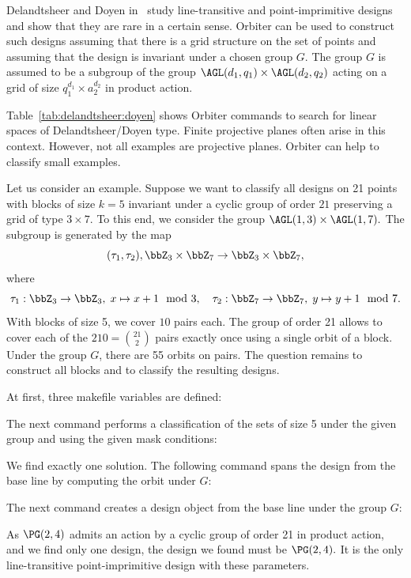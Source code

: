 

Delandtsheer and Doyen in~\cite{DelandtsheerDoyen1989} study 
line-transitive and point-imprimitive designs 
and show that they are rare in a certain sense.
Orbiter can be used to construct such designs 
assuming that there is a grid structure on the set 
of points and assuming that the design is invariant under a chosen group $G$. 
The group $G$ is assumed to be a subgroup of the group 
$\AGL(d_1,q_1) \times \AGL(d_2,q_2)$ acting on a grid of size 
$q_1^{d_1} \times a_2^{d_2}$ in product action.

\bigskip


Table~\ref{tab:delandtsheer:doyen} 
shows Orbiter commands to search for linear spaces of Delandtsheer/Doyen type.
Finite projective planes often arise in this context. 
However, not all examples are projective planes. 
Orbiter can help to classify small examples.

\bigskip

Let us consider an example. 
Suppose we want to classify all designs on 21 points with blocks of size $k=5$ 
invariant under a cyclic group of order $21$ preserving a grid of type $3 \times 7.$ 
To this end, we consider the group $\AGL(1,3) \times \AGL(1,7).$ 
The subgroup is generated by the map
$$
(\tau_1,\tau_2), \bbZ_3 \times \bbZ_7 \rightarrow  \bbZ_3 \times \bbZ_7,
$$ 
where 
$$
\tau_1: \bbZ_3 \rightarrow \bbZ_3, \; x \mapsto x+1 \mod 3,
\quad
\tau_2: \bbZ_7 \rightarrow \bbZ_7, \; y \mapsto y+1 \mod 7.
$$
With blocks of size 5, we cover $10$ pairs each. 
The group of order 21 allows to cover each of the $210={21\choose 2}$ pairs 
exactly once using a single orbit of a block.
Under the group $G$, there are 55 orbits on pairs.
The question remains to construct all blocks and to classify the resulting designs.

At first, three makefile variables are defined:







The next command performs a classification of the sets of size 5 
under the given group and using the given mask conditions:


We find exactly one solution. 
The following command spans the design from the base line by computing the orbit under $G$:


The next command creates a design object from the base line under the group $G$:


As $\PG(2,4)$ admits an action by a cyclic group of order 21 in product action, 
and we find only one design, 
the design we found must be $\PG(2,4).$ 
It is the only line-transitive point-imprimitive design with these parameters.


